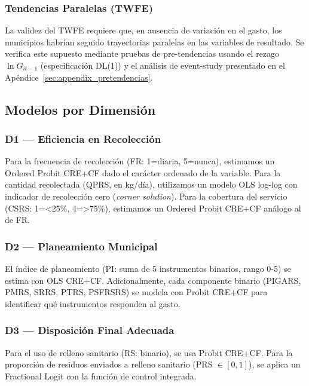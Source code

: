 \subsubsection*{Tendencias Paralelas (TWFE)}

La validez del TWFE requiere que, en ausencia de variación en el gasto, los municipios habrían seguido trayectorias paralelas en las variables de resultado.
Se verifica este supuesto mediante pruebas de pre-tendencias usando el rezago $\ln G_{it-1}$ (especificación DL(1)) y el análisis de event-study presentado en el Apéndice~\cref{sec:appendix_pretendencias}.

\subsection{Modelos por Dimensión}
\label{sec:modelos_dimension}

\subsubsection*{D1 --- Eficiencia en Recolección}

Para la frecuencia de recolección (FR: 1=diaria, 5=nunca), estimamos un Ordered Probit CRE+CF dado el carácter ordenado de la variable.
Para la cantidad recolectada (QPRS, en kg/día), utilizamos un modelo OLS log-log con indicador de recolección cero (\textit{corner solution}).
Para la cobertura del servicio (CSRS: 1=\textless{}25\%, 4=\textgreater{}75\%), estimamos un Ordered Probit CRE+CF análogo al de FR.

\subsubsection*{D2 --- Planeamiento Municipal}

El índice de planeamiento (PI: suma de 5 instrumentos binarios, rango 0-5) se estima con OLS CRE+CF.
Adicionalmente, cada componente binario (PIGARS, PMRS, SRRS, PTRS, PSFRSRS) se modela con Probit CRE+CF para identificar qué instrumentos responden al gasto.

\subsubsection*{D3 --- Disposición Final Adecuada}

Para el uso de relleno sanitario (RS: binario), se usa Probit CRE+CF.
Para la proporción de residuos enviados a relleno sanitario (PRS $\in [0,1]$), se aplica un Fractional Logit \citep{PapkeWooldridge1996} con la función de control integrada.

